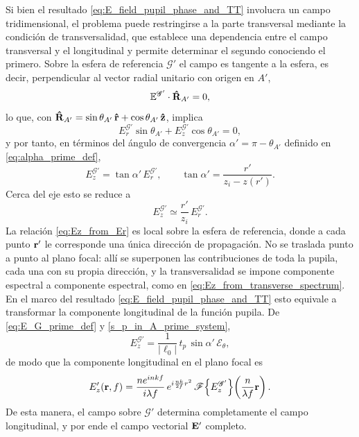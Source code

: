 Si bien el resultado \eqref{eq:E_field_pupil_phase_and_TT} involucra un campo tridimensional, el problema puede restringirse a la parte transversal mediante la condición de transversalidad, que establece una dependencia entre el campo transversal y el longitudinal y permite determinar el segundo conociendo el primero. Sobre la esfera de referencia $\mathscr G'$ el campo es tangente a la esfera, es decir, perpendicular al vector radial unitario con origen en $A'$,
\begin{equation}
\mathbb E^{\mathscr G'}\cdot\bm{\hat{\mathbf{R}}}_{A'}=0,
\label{eq:transversality_condition}
\end{equation}
lo que, con $\bm{\hat{\mathbf{R}}}_{A'}=\sin\theta_{A'}\,\bm{\hat{\mathbf{r}}}+\cos\theta_{A'}\,\bm{\hat{\mathbf{z}}}$, implica
\begin{equation}
E^{\mathscr G'}_r\sin\theta_{A'} + E^{\mathscr G'}_z\cos\theta_{A'} = 0,
\end{equation}
y por tanto, en términos del ángulo de convergencia $\alpha'=\pi-\theta_{A'}$ definido en \eqref{eq:alpha_prime_def},
\begin{equation}
E^{\mathscr G'}_z
=
\tan\alpha'\,E^{\mathscr G'}_r,
\qquad
\tan\alpha'=\frac{r'}{z_i-z(r')}.
\label{eq:Ez_from_Er}
\end{equation}
Cerca del eje esto se reduce a
\begin{equation}
  E^{\mathscr G'}_z
  \simeq
  \frac{r'}{z_i} \,E^{\mathscr G'}_r.
\label{eq:Ez_from_Er_rz}
\end{equation}
La relación \eqref{eq:Ez_from_Er} es local sobre la esfera de referencia, donde a cada punto $\vb r'$ le corresponde una única dirección de propagación. No se traslada punto a punto al plano focal: allí se superponen las contribuciones de toda la pupila, cada una con su propia dirección, y la transversalidad se impone componente espectral a componente espectral, como en \eqref{eq:Ez_from_transverse_spectrum}. En el marco del resultado \eqref{eq:E_field_pupil_phase_and_TT} esto equivale a transformar la componente longitudinal de la función pupila. De \eqref{eq:E_G_prime_def} y \eqref{s_p_in_A_prime_system},
\begin{equation}
  E^{\mathscr G'}_z
  =
  \frac{1}{|\ell_0|}\,t_p\,\sin\alpha'\,\mathscr E_\theta,
  \label{eq:Ez_pupil}
\end{equation}
de modo que la componente longitudinal en el plano focal es
\begin{equation}
  E'_z(\vb r, f)
  =
  \frac{ne^{inkf}}{i\lambda f}\,e^{i\frac{nk}{2f}r^2}
  \,\mathscr F\!\left\{E^{\mathscr G'}_z\right\}\!\left(\frac{n}{\lambda f}\vb r\right).
  \label{eq:Ez_focal_from_pupil}
\end{equation}
De esta manera, el campo sobre $\mathscr G'$ determina completamente el campo longitudinal, y por ende el campo vectorial $\vb E'$ completo.

